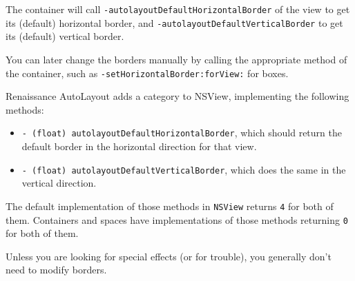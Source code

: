 The container will call \texttt{-autolayoutDefaultHorizontalBorder} of
the view to get its (default) horizontal border, and
\texttt{-autolayoutDefaultVerticalBorder} to get its (default) vertical 
border.

You can later change the borders manually by calling the appropriate
method of the container, such as
\texttt{-setHorizontalBorder:forView:} for boxes.

Renaissance AutoLayout adds a category to NSView, implementing the
following methods:

\begin{itemize}
\item \texttt{- (float) autolayoutDefaultHorizontalBorder}, which
should return the default border in the horizontal direction for that view.
\item \texttt{- (float) autolayoutDefaultVerticalBorder}, which
does the same in the vertical direction.
\end{itemize}

The default implementation of those methods in \texttt{NSView} returns
\texttt{4} for both of them.  Containers and spaces have implementations
of those methods returning \texttt{0} for both of them.

Unless you are looking for special effects (or for trouble), you
generally don't need to modify borders.
